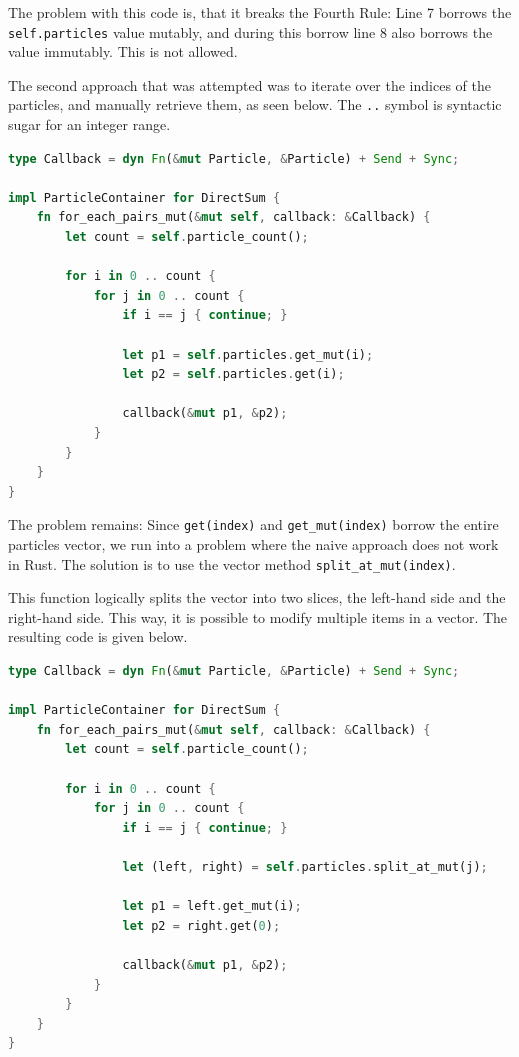 \documentclass[11pt,
               a4paper,
               bibtotoc,
               idxtotoc,
               headsepline,
               footsepline,
               footexclude,
               BCOR12mm,
               DIV13,
               openany,   %
               ]
               {scrbook}
\begin{document}
The problem with this code is, that it breaks the Fourth Rule: Line 7 borrows the \texttt{self.particles} value mutably, and during this borrow line 8 also borrows the value immutably. This is not allowed.

The second approach that was attempted was to iterate over the indices of the particles, and manually retrieve them, as seen below. The \texttt{..} symbol is syntactic sugar for an integer range.

\vspace{0.5em}
\begin{lstlisting}[style=eclipse-rust, language=Rust, basicstyle=\ttfamily\small, caption={Second approach at DirectSum particle pairs iteration.}]
type Callback = dyn Fn(&mut Particle, &Particle) + Send + Sync;

impl ParticleContainer for DirectSum {
    fn for_each_pairs_mut(&mut self, callback: &Callback) {
        let count = self.particle_count();

        for i in 0 .. count {
            for j in 0 .. count {
                if i == j { continue; }

                let p1 = self.particles.get_mut(i);
                let p2 = self.particles.get(i);

                callback(&mut p1, &p2);
            }
        }
    }
}
\end{lstlisting}

The problem remains: Since \texttt{get(index)} and \texttt{get\_mut(index)} borrow the entire particles vector, we run into a problem where the naive approach does not work in Rust. The solution is to use the vector method \texttt{split\_at\_mut(index)}.

This function logically splits the vector into two slices, the left-hand side and the right-hand side. This way, it is possible to modify multiple items in a vector. The resulting code is given below.

\vspace{0.5em}
\begin{lstlisting}[style=eclipse-rust, language=Rust, basicstyle=\ttfamily\small, caption={Second approach at DirectSum particle pairs iteration.}]
type Callback = dyn Fn(&mut Particle, &Particle) + Send + Sync;

impl ParticleContainer for DirectSum {
    fn for_each_pairs_mut(&mut self, callback: &Callback) {
        let count = self.particle_count();

        for i in 0 .. count {
            for j in 0 .. count {
                if i == j { continue; }

                let (left, right) = self.particles.split_at_mut(j);

                let p1 = left.get_mut(i);
                let p2 = right.get(0);

                callback(&mut p1, &p2);
            }
        }
    }
}
\end{lstlisting}
\end{document}
